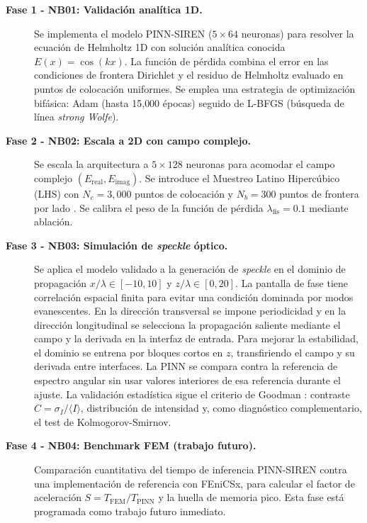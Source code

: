 \begin{description}
    \item[\textbf{Fase 1 - NB01: Validación analítica 1D.}]
    Se implementa el modelo PINN-SIREN ($5 \times 64$ neuronas) para resolver la
    ecuación de Helmholtz 1D con solución analítica conocida $E(x) = \cos(kx)$.
    La función de pérdida combina el error en las condiciones de frontera
    Dirichlet y el residuo de Helmholtz evaluado en puntos de colocación uniformes.
    Se emplea una estrategia de optimización bifásica: Adam (hasta 15{,}000 épocas)
    seguido de L-BFGS (búsqueda de línea \textit{strong Wolfe}).

    \item[\textbf{Fase 2 - NB02: Escala a 2D con campo complejo.}]
    Se escala la arquitectura a $5 \times 128$ neuronas para acomodar el campo
    complejo $(E_\text{real}, E_\text{imag})$. Se introduce el Muestreo Latino
    Hipercúbico (LHS) con $N_c = 3{,}000$ puntos de colocación y $N_b = 300$
    puntos de frontera por lado \parencite{mckay1979lhs}. Se calibra el peso de
    la función de pérdida $\lambda_\text{fís} = 0.1$ mediante ablación.

    \item[\textbf{Fase 3 - NB03: Simulación de \textit{speckle} óptico.}]
    Se aplica el modelo validado a la generación de \textit{speckle} en el dominio
    de propagación $x/\lambda\in[-10,10]$ y $z/\lambda\in[0,20]$. La pantalla
    de fase tiene correlación espacial finita para evitar una condición dominada
    por modos evanescentes. En la dirección transversal se impone periodicidad y
    en la dirección longitudinal se selecciona la propagación saliente mediante
    el campo y la derivada en la interfaz de entrada. Para mejorar la estabilidad,
    el dominio se entrena por bloques cortos en $z$, transfiriendo el campo y su
    derivada entre interfaces. La PINN se compara contra la referencia de
    espectro angular sin usar valores interiores de esa referencia durante el
    ajuste. La validación estadística sigue el criterio de Goodman
    \parencite{goodman2007speckle}: contraste $C = \sigma_I / \langle I \rangle$,
    distribución de intensidad y, como diagnóstico complementario, el test de
    Kolmogorov-Smirnov.

    \item[\textbf{Fase 4 - NB04: Benchmark FEM (trabajo futuro).}]
    Comparación cuantitativa del tiempo de inferencia PINN-SIREN contra una
    implementación de referencia con FEniCSx, para calcular el factor de
    aceleración $S = T_\text{FEM} / T_\text{PINN}$ y la huella de memoria pico.
    Esta fase está programada como trabajo futuro inmediato.
\end{description}

